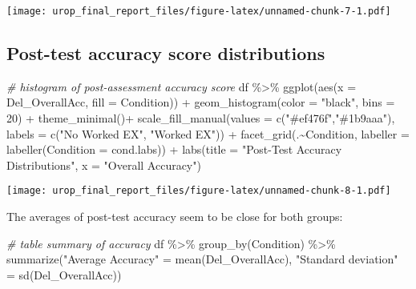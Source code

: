 \documentclass[
]{article}
\newenvironment{Shaded}{\begin{snugshade}}{\end{snugshade}}
\newcommand{\AttributeTok}[1]{\textcolor[rgb]{0.77,0.63,0.00}{#1}}
\newcommand{\CommentTok}[1]{\textcolor[rgb]{0.56,0.35,0.01}{\textit{#1}}}
\newcommand{\DecValTok}[1]{\textcolor[rgb]{0.00,0.00,0.81}{#1}}
\newcommand{\FunctionTok}[1]{\textcolor[rgb]{0.00,0.00,0.00}{#1}}
\newcommand{\NormalTok}[1]{#1}
\newcommand{\OtherTok}[1]{\textcolor[rgb]{0.56,0.35,0.01}{#1}}
\newcommand{\SpecialCharTok}[1]{\textcolor[rgb]{0.00,0.00,0.00}{#1}}
\newcommand{\StringTok}[1]{\textcolor[rgb]{0.31,0.60,0.02}{#1}}
\begin{document}
\texttt{[image: urop\_final\_report\_files/figure-latex/unnamed-chunk-7-1.pdf]}

\hypertarget{post-test-accuracy-score-distributions}{%
\subsection{Post-test accuracy score
distributions}\label{post-test-accuracy-score-distributions}}

\begin{Shaded}
\begin{Highlighting}[]
\CommentTok{\# histogram of post{-}assessment accuracy score}
\NormalTok{df }\SpecialCharTok{\%\textgreater{}\%} 
  \FunctionTok{ggplot}\NormalTok{(}\FunctionTok{aes}\NormalTok{(}\AttributeTok{x =}\NormalTok{ Del\_OverallAcc, }\AttributeTok{fill =}\NormalTok{ Condition)) }\SpecialCharTok{+}
  \FunctionTok{geom\_histogram}\NormalTok{(}\AttributeTok{color =} \StringTok{"black"}\NormalTok{, }\AttributeTok{bins =} \DecValTok{20}\NormalTok{) }\SpecialCharTok{+}
  \FunctionTok{theme\_minimal}\NormalTok{()}\SpecialCharTok{+} 
  \FunctionTok{scale\_fill\_manual}\NormalTok{(}\AttributeTok{values =} \FunctionTok{c}\NormalTok{(}\StringTok{"\#ef476f"}\NormalTok{,}\StringTok{"\#1b9aaa"}\NormalTok{), }\AttributeTok{labels =} \FunctionTok{c}\NormalTok{(}\StringTok{"No Worked EX"}\NormalTok{, }\StringTok{"Worked EX"}\NormalTok{)) }\SpecialCharTok{+}
  \FunctionTok{facet\_grid}\NormalTok{(.}\SpecialCharTok{\textasciitilde{}}\NormalTok{Condition, }\AttributeTok{labeller =} \FunctionTok{labeller}\NormalTok{(}\AttributeTok{Condition =}\NormalTok{ cond.labs))  }\SpecialCharTok{+}
  \FunctionTok{labs}\NormalTok{(}\AttributeTok{title =} \StringTok{"Post{-}Test Accuracy Distributions"}\NormalTok{, }\AttributeTok{x =} \StringTok{"Overall Accuracy"}\NormalTok{)}
\end{Highlighting}
\end{Shaded}

\texttt{[image: urop\_final\_report\_files/figure-latex/unnamed-chunk-8-1.pdf]}

The averages of post-test accuracy seem to be close for both groups:

\begin{Shaded}
\begin{Highlighting}[]
\CommentTok{\# table summary of accuracy}
\NormalTok{df }\SpecialCharTok{\%\textgreater{}\%} 
  \FunctionTok{group\_by}\NormalTok{(Condition) }\SpecialCharTok{\%\textgreater{}\%} 
  \FunctionTok{summarize}\NormalTok{(}\StringTok{"Average Accuracy"} \OtherTok{=} \FunctionTok{mean}\NormalTok{(Del\_OverallAcc), }\StringTok{"Standard deviation"} \OtherTok{=} \FunctionTok{sd}\NormalTok{(Del\_OverallAcc))}
\end{Highlighting}
\end{Shaded}
\end{document}
